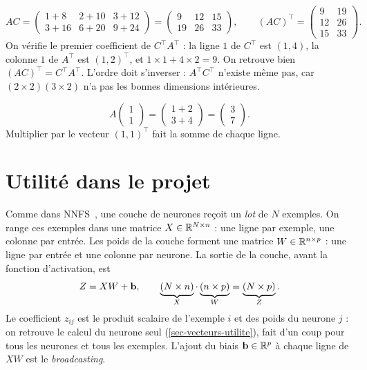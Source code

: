 \begin{example}
\[
    AC =
    \begin{pmatrix}
        1 + 8 & 2 + 10 & 3 + 12 \\
        3 + 16 & 6 + 20 & 9 + 24
    \end{pmatrix}
    = \begin{pmatrix} 9 & 12 & 15 \\ 19 & 26 & 33 \end{pmatrix},
    \qquad
    (AC)^\top = \begin{pmatrix} 9 & 19 \\ 12 & 26 \\ 15 & 33 \end{pmatrix}.
\]
On vérifie le premier coefficient de $C^\top A^\top$ :
la ligne $1$ de $C^\top$ est $(1, 4)$, la colonne $1$
de $A^\top$ est $(1, 2)^\top$, et
$1 \times 1 + 4 \times 2 = 9$. On retrouve bien
$(AC)^\top = C^\top A^\top$. L'ordre doit s'inverser :
$A^\top C^\top$ n'existe même pas, car
$(2 \times 2)(3 \times 2)$ n'a pas les bonnes
dimensions intérieures.
\end{example}

\begin{example}
\[
    A \begin{pmatrix} 1 \\ 1 \end{pmatrix}
    = \begin{pmatrix} 1 + 2 \\ 3 + 4 \end{pmatrix}
    = \begin{pmatrix} 3 \\ 7 \end{pmatrix}.
\]
Multiplier par le vecteur $(1, 1)^\top$ fait la somme
de chaque ligne.
\end{example}

\section{Utilité dans le projet}

Comme dans NNFS~\cite{nnfs}, une couche de neurones
reçoit un \emph{lot} de $N$
exemples. On range ces exemples dans une matrice
$X \in \mathbb{R}^{N \times n}$ : une ligne par exemple, une
colonne par entrée. Les poids de la couche forment une
matrice $W \in \mathbb{R}^{n \times p}$ : une ligne par entrée
et une colonne par neurone. La sortie de la couche,
avant la fonction d'activation, est
\[
    Z = X W + \mathbf{b},
    \qquad
    \underbrace{(N \times n)}_{X}
    \cdot
    \underbrace{(n \times p)}_{W}
    = \underbrace{(N \times p)}_{Z}.
\]
Le coefficient $z_{ij}$ est le produit scalaire de
l'exemple $i$ et des poids du neurone $j$ : on retrouve
le calcul du neurone seul
(\cref{sec-vecteurs-utilite}), fait
d'un coup pour tous les neurones et tous les exemples.
L'ajout du biais $\mathbf{b} \in \mathbb{R}^p$ à chaque ligne
de $XW$ est le \emph{broadcasting}.

